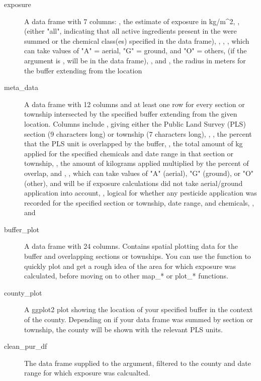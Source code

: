 \documentclass[a4paper]{book}
\begin{document}
\begin{Value}
\begin{description}
\item[exposure] A data frame with 7 columns: ,
the estimate of exposure in kg/m\textasciicircum{}2, , (either "all",
indicating that all active ingredients present in the 
were summed or the chemical class(es) specified in the 
data frame), , , ,
which can take values of "A" = aerial, "G" = ground, and "O" = others, (if
the  argument is , 
will be  in the  data frame), , and
, the radius in meters for the buffer extending from the
location
\item[meta\_data] A data frame with 12 columns and at least one row for
every section or township intersected by the specified buffer extending
from the given location. Columns include , giving either the
Public Land Survey (PLS) section (9 characters long) or township (7
characters long), , , the percent that the
PLS unit is overlapped by the buffer, , the total amount of kg
applied for the specified chemicals and date range in that section or
township, , the amount of kilograms applied
multiplied by the percent of overlap,  and ,
, which can take values of "A" (aerial), "G" (ground),
or "O" (other), and will be  if exposure calculations did not
take aerial/ground application into account, , logical
for whether any pesticide application was recorded for the specified section
or township, date range, and chemicals, , and 
\item[buffer\_plot] A data frame with 24 columns. Contains spatial plotting
data for the buffer and overlapping sections or townships. You can use the
 function to quickly plot and get a rough idea of the
area for which exposure was calculated, before moving on to other map\_*
or plot\_* functions.
\item[county\_plot] A ggplot2 plot showing the location of your specified
buffer in the context of the county. Depending on if your 
data frame was summed by section or township, the county will be shown
with the relevant PLS units.
\item[clean\_pur\_df] The data frame supplied to the 
argument, filtered to the county and date range for which exposure
was calcualted.

\end{description}

\end{Value}
\end{document}
